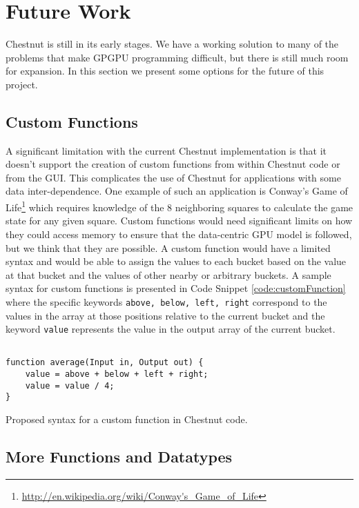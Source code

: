 \documentclass[twocolumn]{article}
\renewcommand{\|}{\origbar} %
\newcommand{\code}[1]{\texttt{#1}}
\begin{document}
\section{Future Work}
\label{sec:future}

Chestnut is still in its early stages. We have a working solution to many of the problems that make GPGPU programming difficult, but there is still much room for expansion. In this section we present some options for the future of this project.

\subsection{Custom Functions}

A significant limitation with the current Chestnut implementation is that it doesn't support the creation of custom functions from within Chestnut code or from the GUI. This complicates the use of Chestnut for applications with some data inter-dependence. One example of such an application is Conway's Game of Life\footnote{\url{http://en.wikipedia.org/wiki/Conway's_Game_of_Life}} which requires knowledge of the 8 neighboring squares to calculate the game state for any given square. Custom functions would need significant limits on how they could access memory to ensure that the data-centric GPU model is followed, but we think that they are possible. A custom function would have a limited syntax and would be able to assign the values to each bucket based on the value at that bucket and the values of other nearby or arbitrary buckets. A sample syntax for custom functions is presented in Code Snippet \ref{code:customFunction} where the specific keywords \code{above, below, left, right} correspond to the values in the array at those positions relative to the current bucket and the keyword \code{value} represents the value in the output array of the current bucket.

\begin{Code Snippet}
\begin{verbatim}

function average(Input in, Output out) {
    value = above + below + left + right;
    value = value / 4;
}
\end{verbatim}
\caption{Proposed syntax for a custom function in Chestnut code.}
\label{code:customFunction}
\end{Code Snippet}


\subsection{More Functions and Datatypes}
\end{document}

